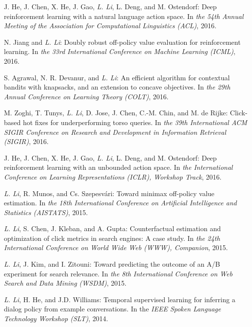 \documentclass[10pt,twoside,letterpaper]{article}
\newcommand{\selffont}[1]{{\textit{#1}}}
\newcommand{\venuefont}[1]{{\textit{#1}}}
\newcommand{\myself}{\selffont{L. Li}}
\begin{document}
\begin{compactenum}[(C1)]
\item{J. He, J. Chen, X. He, J. Gao, \myself, L. Deng, and M. Ostendorf: Deep reinforcement learning with a natural language action space.  In \venuefont{the 54th Annual Meeting of the Association for Computational Linguistics (ACL)}, 2016.}

\item{N. Jiang and \myself: Doubly robust off-policy value evaluation for reinforcement learning.  In \venuefont{the 33rd International Conference on Machine Learning (ICML)}, 2016.}

\item{S. Agrawal, N. R. Devanur, and \myself: An efficient algorithm for contextual bandits with knapsacks, and an extension to concave objectives.  In \venuefont{the 29th Annual Conference on Learning Theory (COLT)}, 2016.}

\item{M. Zoghi, T. Tunys, \myself, D. Jose, J. Chen, C.-M. Chin, and M. de Rijke: Click-based hot fixes for underperforming torso queries.  In \venuefont{the 39th International ACM SIGIR Conference on Research and Development in Information Retrieval (SIGIR)}, 2016.}

\item{J. He, J. Chen, X. He, J. Gao, \myself, L. Deng, and M. Ostendorf: Deep reinforcement learning with an unbounded action space.  In \venuefont{the International Conference on Learning Representations (ICLR), Workshop Track}, 2016.}

\item{\myself, R. Munos, and Cs. Szepesv\'{a}ri: Toward minimax off-policy value estimation.  In \venuefont{the 18th International Conference on Artificial Intelligence and Statistics (AISTATS)}, 2015.}

\item{\myself, S. Chen, J. Kleban, and A. Gupta: Counterfactual estimation and optimization of click metrics in search engines: A case study.  In \venuefont{the 24th International Conference on World Wide Web (WWW), Companion}, 2015.}

\item{\myself, J. Kim, and I. Zitouni: Toward predicting the outcome of an {A/B} experiment for search relevance.  In \venuefont{the 8th International Conference on Web Search and Data Mining (WSDM)}, 2015.}

\item{\myself, H. He, and J.D. Williams: Temporal supervised learning for inferring a dialog policy from example conversations.  In the \venuefont{IEEE Spoken Language Technology Workshop (SLT)}, 2014.}


\end{compactenum}
\end{document}
